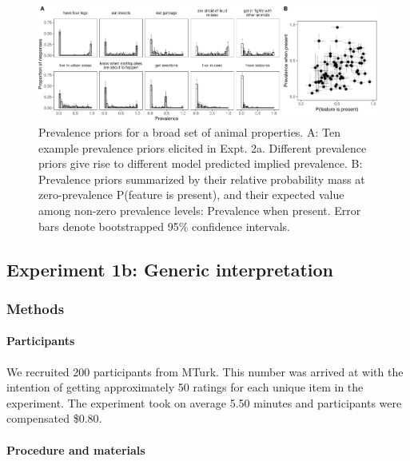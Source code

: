 \documentclass[floatsintext,doc]{apa6}
\let\oldparagraph\paragraph
\renewcommand{\paragraph}[1]{\oldparagraph{#1}\mbox{}}
\begin{document}
\begin{figure}
\centering
\includegraphics{genint_files/figure-latex/genInt-prevPrior-1.pdf}
\caption{\label{fig:genInt-prevPrior}Prevalence priors for a broad set of animal properties. A: Ten example prevalence priors elicited in Expt. 2a. Different prevalence priors give rise to different model predicted implied prevalence. B: Prevalence priors summarized by their relative probability mass at zero-prevalence P(feature is present), and their expected value among non-zero prevalence levels: Prevalence when present. Error bars denote bootstrapped 95\% confidence intervals.}
\end{figure}

\hypertarget{experiment-1b-generic-interpretation}{%
\subsection{Experiment 1b: Generic interpretation}\label{experiment-1b-generic-interpretation}}

\hypertarget{methods-1}{%
\subsubsection{Methods}\label{methods-1}}

\hypertarget{participants-2}{%
\paragraph{Participants}\label{participants-2}}

We recruited 200 participants from MTurk.
This number was arrived at with the intention of getting approximately 50 ratings for each unique item in the experiment.
The experiment took on average 5.50 minutes and participants were compensated \$0.80.

\hypertarget{procedure-and-materials-2}{%
\paragraph{Procedure and materials}\label{procedure-and-materials-2}}
\end{document}
